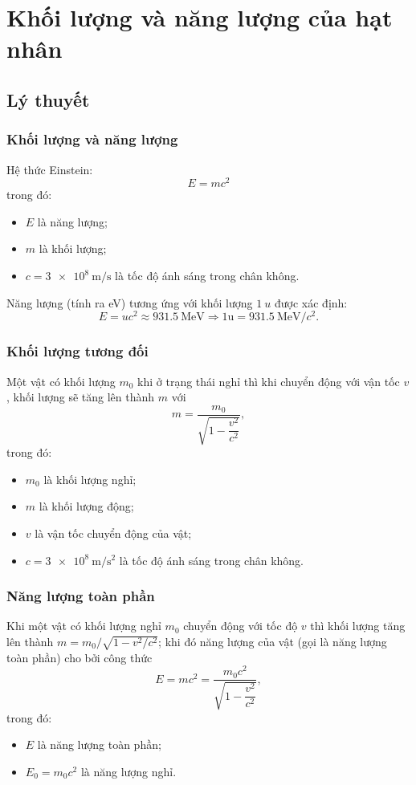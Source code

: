 
\chapter[Khối lượng và năng lượng của hạt nhân]{Khối lượng và năng lượng của hạt nhân}
\section{Lý thuyết}

\subsection{Khối lượng và năng lượng}
Hệ thức Einstein:
\begin{equation}
	E=mc^2
\end{equation}
trong đó:
\begin{itemize}
	\item $E$ là năng lượng;
	\item $m$ là khối lượng;
	\item $c=\SI{3e8}{\meter/\second}$ là tốc độ ánh sáng trong chân không.
\end{itemize}
Năng lượng (tính ra eV) tương ứng với khối lượng $\SI{1}{u}$ được xác định:
\begin{equation}
	E=uc^2\approx\SI{931,5}{\MeV}
	\Rightarrow 1\text{u}=\SI{931,5}{\MeV/c^2}.
\end{equation}
\subsection{Khối lượng tương đối}
Một vật có khối lượng $m_0$ khi ở trạng thái nghỉ thì khi chuyển động với vận tốc $v$, khối lượng sẽ tăng lên thành $m$ với
\begin{equation}
	m=\dfrac{m_0}{\sqrt{1-\dfrac{v^2}{c^2}}},
\end{equation}
trong đó:
\begin{itemize}
	\item $m_0$ là khối lượng nghỉ;
	\item $m$ là khối lượng động;
	\item $v$ là vận tốc chuyển động của vật;
	\item $c=\SI{3e8}{\meter/\second^2}$ là tốc độ ánh sáng trong chân không.
\end{itemize}
\subsection{Năng lượng toàn phần}
Khi một vật có khối lượng nghỉ $m_0$ chuyển động với tốc độ $v$ thì khối lượng tăng lên thành $m={m_0}/{\sqrt{1-{v^2}/{c^2}}}$; khi đó năng lượng của vật (gọi là năng lượng toàn phần) cho bởi công thức
\begin{equation}
	E=mc^2=\dfrac{m_0c^2}{\sqrt{1-\dfrac{v^2}{c^2}}},
\end{equation}
trong đó:
\begin{itemize}
	\item $E$ là năng lượng toàn phần;
	\item $E_0=m_0c^2$ là năng lượng nghỉ.
\end{itemize}

